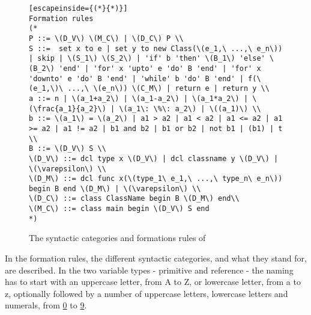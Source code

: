 \begin{figure}[H]
\begin{lstlisting}[escapeinside={(*}{*)}]
Formation rules
(*
P ::= \(D_V\) \(M_C\) | \(D_C\) P \\
S ::=  set x to e | set y to new Class(\(e_1,\ ...,\ e_n\)) | skip | \(S_1\) \(S_2\) | 'if' b 'then' \(B_1\) 'else' \(B_2\) 'end' | 'for' x 'upto' e 'do' B 'end' | 'for' x 'downto' e 'do' B 'end' | 'while' b 'do' B 'end' | f(\(e_1,\)\ ...,\ \(e_n\)) \(C_M\) | return e | return y \\
a ::= n | \(a_1+a_2\) | \(a_1-a_2\) | \(a_1*a_2\) | \(\frac{a_1}{a_2}\) | \(a_1\: \%\: a_2\) | \((a_1)\) \\
b ::= \(a_1\) = \(a_2\) | a1 > a2 | a1 < a2 | a1 <= a2 | a1 >= a2 | a1 != a2 | b1 and b2 | b1 or b2 | not b1 | (b1) | t \\
B ::= \(D_V\) S \\
\(D_V\) ::= dcl type x \(D_V\) | dcl classname y \(D_V\) |  \(\varepsilon\) \\
\(D_M\) ::= dcl func x(\(type_1\ e_1,\ ...,\ type_n\ e_n\)) begin B end \(D_M\) | \(\varepsilon\) \\
\(D_C\) ::= class ClassName begin B \(D_M\) end\\
\(M_C\) ::= class main begin \(D_V\) S end
*)
    \end{lstlisting}
    \caption{The syntactic categories and formations rules of \lang{}}
    \label{fig:AS}
\end{figure}

In the formation rules, the different syntactic categories, and what they stand for, are described. In the two variable types - primitive and reference - the naming has to start with an uppercase letter, from A to Z, or lowercase letter, from a to z, optionally followed by a number of uppercase letters, lowercase letters and numerals, from \underline{0} to \underline{9}.